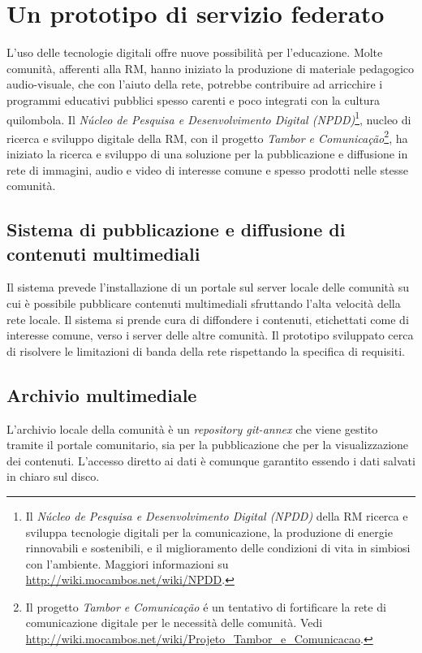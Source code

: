 
\chapter{Un prototipo di servizio federato}
\label{Capitolo3}

L'uso delle tecnologie digitali offre nuove possibilità per
l'educazione. Molte comunità, afferenti alla RM, hanno iniziato la
produzione di materiale pedagogico audio-visuale, che con l'aiuto
della rete, potrebbe contribuire ad arricchire i programmi educativi
pubblici spesso carenti e poco integrati con la cultura quilombola. Il
\emph{Núcleo de Pesquisa e Desenvolvimento Digital (NPDD)}\footnote{Il
  \emph{Núcleo de Pesquisa e Desenvolvimento Digital (NPDD)} della RM
  ricerca e sviluppa tecnologie digitali per la comunicazione, la
  produzione di energie rinnovabili e sostenibili, e il miglioramento
  delle condizioni di vita in simbiosi con l'ambiente. Maggiori
  informazioni su \url{http://wiki.mocambos.net/wiki/NPDD}.}, nucleo
di ricerca e sviluppo digitale della RM, con il progetto \emph{Tambor
  e Comunicação}\footnote{Il progetto \emph{Tambor e Comunicação} é un
  tentativo di fortificare la rete di comunicazione digitale per le
  necessità delle comunità. Vedi
  \url{http://wiki.mocambos.net/wiki/Projeto_Tambor_e_Comunicacao}.},
ha iniziato la ricerca e sviluppo di una soluzione per la
pubblicazione e diffusione in rete di immagini, audio e video di
interesse comune e spesso prodotti nelle stesse comunità.

\section{Sistema di pubblicazione e diffusione di contenuti
  multimediali}
Il sistema prevede l'installazione di un portale sul server locale
delle comunità su cui è possibile pubblicare contenuti multimediali
sfruttando l'alta velocità della rete locale. Il sistema si prende
cura di diffondere i contenuti, etichettati come di interesse comune,
verso i server delle altre comunità. Il prototipo sviluppato cerca di
risolvere le limitazioni di banda della rete rispettando la specifica
di requisiti. 

\section{Archivio multimediale}
L'archivio locale della comunità è un \emph{repository git-annex} che
viene gestito tramite il portale comunitario, sia per la pubblicazione
che per la visualizzazione dei contenuti. L'accesso diretto ai dati è
comunque garantito essendo i dati salvati in chiaro sul disco. 

